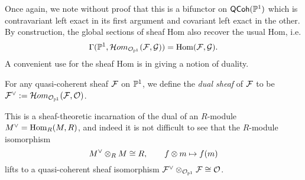 Once again, we note without proof that this is a bifunctor on
$\operatorname{\mathsf{QCoh}}(\mathbb{P}^{{1}})$ which is contravariant left exact in its first
argument and covariant left exact in the other.
By construction, the global sections of sheaf Hom also recover the
usual Hom, i.e.
\[
  \Gamma({\mathbb{P}^{{1}}}, {\mathcal{H}om_{\mathcal{O}_{{\mathbb{P}^{{1}}}}}(\mathcal{F}, \mathcal{G})}) = \operatorname{Hom}(\mathcal{F}, \mathcal{G}).
\]
A convenient use for the sheaf Hom is in giving a notion of duality.

\begin{definition}
  For any quasi-coherent sheaf $\mathcal{F}$ on $\proj{1}$, we define the
  \emph{dual sheaf} of $\mathcal{F}$ to be ${\mathcal{F}}^{\lor} :=
  \mathcal{H}om_{\mathcal{O}_{{\mathbb{P}^{{1}}}}}(\mathcal{F}, \mathcal{O})$.
\end{definition}

This is a sheaf-theoretic incarnation of the dual of an $R$-module
${M}^{\lor} = \operatorname{Hom}_R(M, R)$, and indeed it is not difficult to see that
the $R$-module isomorphism
\[
  {M}^{\lor} \otimes_R M \cong R, \qquad f \otimes m \mapsto f(m)
\]
lifts to a quasi-coherent sheaf isomorphism ${\mathcal{F}}^{\lor}
\otimes_{\mathcal{O}_{{\mathbb{P}^{{1}}}}} \mathcal{F} \cong \mathcal{O}$.

\iffalse
The sheaf Hom and tensor product give additional structure to $\Pic$,
the set of isomorphism classes of line bundles on $\proj{1}$, and is
of relevance to the theory of \emph{divisors} on a variety.
It is clear that the tensor product of line bundles is a line bundle,
and also that $\shf{L} \shftensor \shf{O} \cong \shf{L}$ for any line
bundle $\shf{L}$.
We define the \emph{dual bundle} of $\shf{L}$ by $\dual{\shf{L}} :=
\shfhom(\shf{L}, \shf{O})$, and one can check that the $R$-module isomorphism
\[
  \Hom_R(M, R) \tensor_R M \cong R, \qquad f \tensor m \mapsto f(m)
\]
lifts to an isomorphism $\dual{\shf{L}} \shftensor \shf{L} \cong \shf{O}$.
Thus $\Pic$ is an abelian group under $\shftensor$ with identity
element $\shf{O}$, called the \emph{Picard group} of $\proj{1}$.
The dual of a line bundle is by construction its inverse in this
group, which is why line bundles are also called invertible sheaves.
By \cref{prop_shftensor_of_twists}, we have $\dual{\twist{n}} =
\twist{-n}$, and it turns out that $\Pic$ is generated by the line
bundle $\twist{1}$, i.e. $\Pic \cong \bb{Z}$.
This is a non-trivial statement, and is proven in a more formal
setting in \cite[Proposition~II.6.17]{hartshorne}.
\fi

\fi
